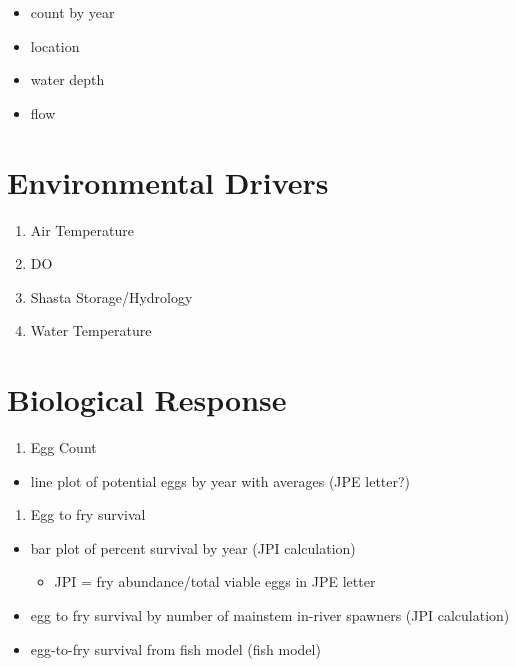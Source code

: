 \documentclass[
]{book}
\providecommand{\tightlist}{%
  \setlength{\itemsep}{0pt}\setlength{\parskip}{0pt}}
\theoremstyle{definition}
\theoremstyle{definition}
\theoremstyle{definition}
\theoremstyle{definition}
\theoremstyle{remark}
\begin{document}
\begin{itemize}
\tightlist
\item
  count by year
\item
  location
\item
  water depth
\item
  flow
\end{itemize}

\hypertarget{environmental-drivers}{%
\section{Environmental Drivers}\label{environmental-drivers}}

\begin{enumerate}
\def\labelenumi{\arabic{enumi}.}
\item
  Air Temperature
\item
  DO
\item
  Shasta Storage/Hydrology
\item
  Water Temperature
\end{enumerate}

\hypertarget{biological-response-1}{%
\section{Biological Response}\label{biological-response-1}}

\begin{enumerate}
\def\labelenumi{\arabic{enumi}.}
\tightlist
\item
  Egg Count
\end{enumerate}

\begin{itemize}
\tightlist
\item
  line plot of potential eggs by year with averages (JPE letter?)
\end{itemize}

\begin{enumerate}
\def\labelenumi{\arabic{enumi}.}
\setcounter{enumi}{1}
\tightlist
\item
  Egg to fry survival
\end{enumerate}

\begin{itemize}
\tightlist
\item
  bar plot of percent survival by year (JPI calculation)

  \begin{itemize}
  \tightlist
  \item
    JPI = fry abundance/total viable eggs in JPE letter
  \end{itemize}
\item
  egg to fry survival by number of mainstem in-river spawners (JPI calculation)
\item
  egg-to-fry survival from fish model (fish model)
\end{itemize}
\end{document}
